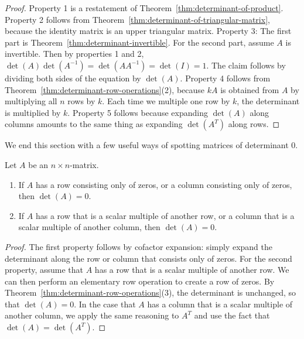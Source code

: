 \begin{proof}
  Property 1 is a restatement of
  Theorem~\ref{thm:determinant-of-product}. Property 2 follows from
  Theorem~\ref{thm:determinant-of-triangular-matrix}, because the
  identity matrix is an upper triangular matrix. Property 3: The first
  part is Theorem~\ref{thm:determinant-invertible}. For the second
  part, assume $A$ is invertible. Then by properties 1 and 2,
  $\det(A)\det(A^{-1}) = \det(AA^{-1}) = \det(I) = 1$. The claim
  follows by dividing both sides of the equation by
  $\det(A)$. Property 4 follows from
  Theorem~\ref{thm:determinant-row-operations}(2), because $kA$ is
  obtained from $A$ by multiplying all $n$ rows by $k$. Each time we
  multiple one row by $k$, the determinant is multiplied by
  $k$. Property 5 follows because expanding $\det(A)$ along columns
  amounts to the same thing as expanding $\det(A^T)$ along rows.
\end{proof}

We end this section with a few useful ways of spotting matrices of
determinant 0.

\begin{theorem}
  Let $A$ be an $n\times n$-matrix.
  \begin{enumerate}
  \item If $A$ has a row consisting only of zeros, or a column
    consisting only of zeros, then $\det(A)=0$.
  \item If $A$ has a row that is a scalar multiple of another row, or
    a column that is a scalar multiple of another column, then
    $\det(A)=0$. 
  \end{enumerate}
\end{theorem}

\begin{proof}
  The first property follows by cofactor expansion: simply expand the
  determinant along the row or column that consists only of zeros.
  For the second property, assume that $A$ has a row that is a scalar
  multiple of another row. We can then perform an elementary row
  operation to create a row of zeros. By
  Theorem~\ref{thm:determinant-row-operations}(3), the determinant is
  unchanged, so that $\det(A)=0$. In the case that $A$ has a column
  that is a scalar multiple of another column, we apply the same
  reasoning to $A^T$ and use the fact that $\det(A)=\det(A^T)$.
\end{proof}

